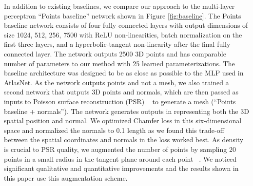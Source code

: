 \documentclass[10pt,twocolumn,letterpaper]{article}
\newcommand{\myparagraph}[1]{\vspace{3pt}\noindent{\bf #1}}
\newcommand{\ournet}{AtlasNet}
\begin{document}
\myparagraph{Points baseline.}
In addition to existing baselines, we compare our approach to the multi-layer perceptron ``Points baseline'' network shown in Figure \ref{fig:baseline}. 
The Points baseline network consists of four fully connected layers with output dimensions of size 1024, 512, 256, 7500 with ReLU non-linearities, batch normalization on the first three layers, and a hyperbolic-tangent non-linearity after the final fully connected layer. The network outputs 2500 3D points and has comparable number of parameters to our method with 25 learned parameterizations. The baseline architecture was designed to be as close as possible to the MLP used in \ournet{}. 
As the network outputs points and not a mesh, we also trained a second network that outputs 3D points and normals, which are then passed as inputs to Poisson surface reconstruction (PSR) ~\cite{kazhdan2013screened} to generate a mesh (``Points baseline + normals''). 
The network generates outputs in  representing both the 3D spatial position and normal. 
We optimized Chamfer loss in this six-dimensional space and normalized the normals to 0.1 length as we found this trade-off between the spatial coordinates and normals in the loss worked best. 
As density is crucial to PSR quality, we augmented the number of points by sampling 20 points in a small radius in the tangent plane around each point ~\cite{kazhdan2013screened}.  We noticed significant qualitative and quantitative improvements and the results shown in this paper use this augmentation scheme.
\end{document}
